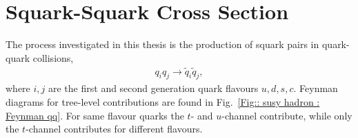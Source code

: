 \documentclass[twoside,english]{uiofysmaster}
\begin{document}
{%

%
%


\section{Squark-Squark Cross Section}
The process investigated in this thesis is the production of squark pairs in quark-quark collisions,
\begin{align}
q_i q_j \rightarrow \widetilde{q}_i \widetilde{q}_j,
\end{align}
where $i,j$ are the first and second generation quark flavours $u, d, s, c$. Feynman diagrams for tree-level contributions are found in Fig.\ \ref{Fig:: susy hadron : Feynman qq}. For same flavour quarks the $t$- and $u$-channel contribute, while only the $t$-channel contributes for different flavours. 

}
\end{document}

